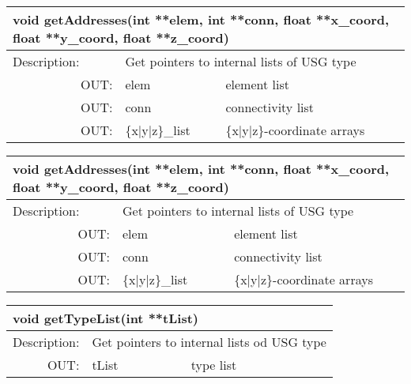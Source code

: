 \latexonly
\begin{longtable}{|p{4cm}|p{2.5cm}|p{7cm}|}
\hline
\multicolumn{3}{|p{13.5cm}|}{\bf void getAddresses(int **elem, int **conn,\newline
              float **x\_coord, float **y\_coord, float **z\_coord)}\\
\hline
{Description:}  
       & \multicolumn{2}{p{9.5cm}|}{Get pointers to internal lists of USG type} \\
\hline
\multicolumn{1}{|r|}{OUT:} & {elem} 
                           & {element list}\\
\hline
\multicolumn{1}{|r|}{OUT:} & {conn} 
                           & {connectivity list}\\
\hline
\multicolumn{1}{|r|}{OUT:}
          & {\{x$\mid$y$\mid$z\}\_list} 
          & {\{x$\mid$y$\mid$z\}-coordinate arrays}\endhead
\hline
\end{longtable}
\endlatexonly

\begin{htmlonly}
\begin{longtable}{|p{4cm}|p{2.5cm}|p{7cm}|}
\hline
\multicolumn{3}{|p{13.5cm}|}{\bf void getAddresses(int **elem, int **conn,\newline
              float **x\_coord, float **y\_coord, float **z\_coord)}\\
\hline
{Description:}  
       & \multicolumn{2}{p{9.5cm}|}{Get pointers to internal lists of USG type} \\
\hline
\multicolumn{1}{|r|}{OUT:} & {elem} 
                           & {element list}\\
\hline
\multicolumn{1}{|r|}{OUT:} & {conn} 
                           & {connectivity list}\\
\hline
\multicolumn{1}{|r|}{OUT:}
          & {\{x|y|z\}\_list} 
          & {\{x|y|z\}-coordinate arrays}\endhead
\hline
\end{longtable}
\end{htmlonly}

\begin{longtable}{|p{4cm}|p{2.5cm}|p{7cm}|}
\hline
\multicolumn{3}{|p{13.5cm}|}{\bf void getTypeList(int **tList)}\\
\hline
{Description:}  
       & \multicolumn{2}{p{9.5cm}|}{Get pointers to internal lists od USG type} \\
\hline
\multicolumn{1}{|r|}{OUT:} & {tList} 
                           & {type list}\endhead
\hline
\end{longtable}

